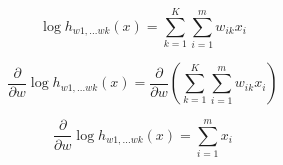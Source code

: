 \documentclass{report}
\begin{document}
  \begin{equation}
    \log h_{w1,...wk}(x)
    = \sum_{k=1}^{K} \sum_{i=1}^m w_{ik}x_i
  \end{equation}

  \begin{equation}
    \frac{\partial}{\partial w} \log h_{w1,...wk}(x)
    = \frac{\partial}{\partial w} \left(\sum_{k=1}^{K} \sum_{i=1}^m w_{ik}x_i\right)
  \end{equation}

  \begin{equation}
    \frac{\partial}{\partial w} \log h_{w1,...wk}(x)
    =  \sum_{i=1}^m x_i
  \end{equation}
\end{document}
